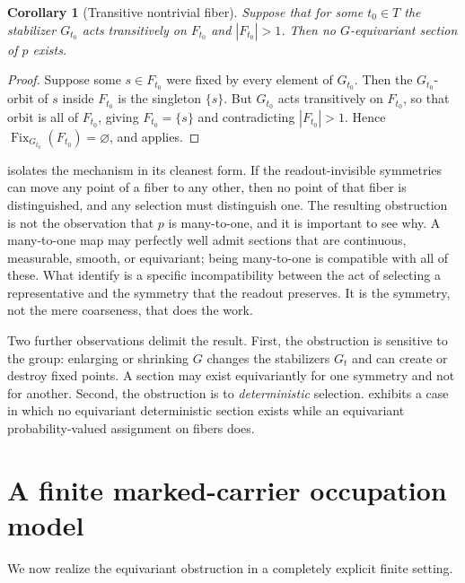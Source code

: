 \documentclass[11pt,reqno]{amsart}
\theoremstyle{plain}
\newtheorem{corollary}[theorem]{Corollary}
\theoremstyle{definition}
\theoremstyle{remark}
\DeclareMathOperator{\Fix}{Fix}
\begin{document}
\begin{corollary}[Transitive nontrivial fiber]
\label{cor:transitive}
Suppose that for some $t_{0}\in T$ the stabilizer $G_{t_{0}}$ acts transitively on $F_{t_{0}}$ and $|F_{t_{0}}|>1$. Then no $G$-equivariant section of $p$ exists.
\end{corollary}

\begin{proof}
Suppose some $s\in F_{t_{0}}$ were fixed by every element of $G_{t_{0}}$. Then the $G_{t_{0}}$-orbit of $s$ inside $F_{t_{0}}$ is the singleton $\{s\}$. But $G_{t_{0}}$ acts transitively on $F_{t_{0}}$, so that orbit is all of $F_{t_{0}}$, giving $F_{t_{0}}=\{s\}$ and contradicting $|F_{t_{0}}|>1$. Hence $\Fix_{G_{t_{0}}}(F_{t_{0}})=\varnothing$, and  applies.
\end{proof}

 isolates the mechanism in its cleanest form. If the readout-invisible symmetries can move any point of a fiber to any other, then no point of that fiber is distinguished, and any selection must distinguish one. The resulting obstruction is not the observation that $p$ is many-to-one, and it is important to see why. A many-to-one map may perfectly well admit sections that are continuous, measurable, smooth, or equivariant; being many-to-one is compatible with all of these. What  identify is a specific incompatibility between the act of selecting a representative and the symmetry that the readout preserves. It is the symmetry, not the mere coarseness, that does the work.

Two further observations delimit the result. First, the obstruction is sensitive to the group: enlarging or shrinking $G$ changes the stabilizers $G_{t}$ and can create or destroy fixed points. A section may exist equivariantly for one symmetry and not for another. Second, the obstruction is to \emph{deterministic} selection.  exhibits a case in which no equivariant deterministic section exists while an equivariant probability-valued assignment on fibers does.

\section{A finite marked-carrier occupation model}
\label{sec:occupation}

We now realize the equivariant obstruction in a completely explicit finite setting.
\end{document}

